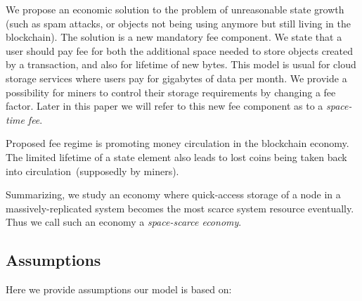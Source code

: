 \documentclass[]{llncs}   %
\begin{document}
We propose an economic solution to the problem of unreasonable state growth
(such as spam attacks, or objects not being using anymore but still living in
the blockchain). The solution is a new mandatory fee component. We state that a
user should pay fee for both the additional space needed to store objects
created by a transaction, and also for lifetime of new bytes. This model is
usual for cloud storage services where users pay for gigabytes of data per
month. We provide a possibility for miners to control their storage requirements
by changing a fee factor. Later in this paper we will refer to this new fee
component as to a {\em space-time fee}.

Proposed fee regime is promoting money circulation in the blockchain economy.
The limited lifetime of a state element also leads to lost coins being taken
back into circulation~(supposedly by miners). 

Summarizing, we study an economy where quick-access storage of a node in a
massively-replicated system becomes the most scarce system resource eventually.
Thus we call such an economy a {\em space-scarce economy}.

\subsection{Assumptions}
Here we provide assumptions our model is based on:
\end{document}
